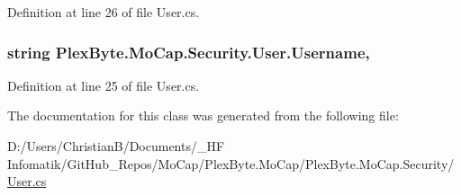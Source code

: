 Definition at line 26 of file User.\+cs.

\subsubsection[{\texorpdfstring{Username}{Username}}]{\setlength{\rightskip}{0pt plus 5cm}string Plex\+Byte.\+Mo\+Cap.\+Security.\+User.\+Username\hspace{0.3cm}{\ttfamily [get]}, {\ttfamily [set]}}\hypertarget{class_plex_byte_1_1_mo_cap_1_1_security_1_1_user_ab82f0c260e1863ade8f069da91405ab2}{}\label{class_plex_byte_1_1_mo_cap_1_1_security_1_1_user_ab82f0c260e1863ade8f069da91405ab2}


Definition at line 25 of file User.\+cs.



The documentation for this class was generated from the following file\+:\begin{DoxyCompactItemize}
\item 
D\+:/\+Users/\+Christian\+B/\+Documents/\+\_\+\+H\+F Infomatik/\+Git\+Hub\+\_\+\+Repos/\+Mo\+Cap/\+Plex\+Byte.\+Mo\+Cap/\+Plex\+Byte.\+Mo\+Cap.\+Security/\hyperlink{_user_8cs}{User.\+cs}\end{DoxyCompactItemize}
